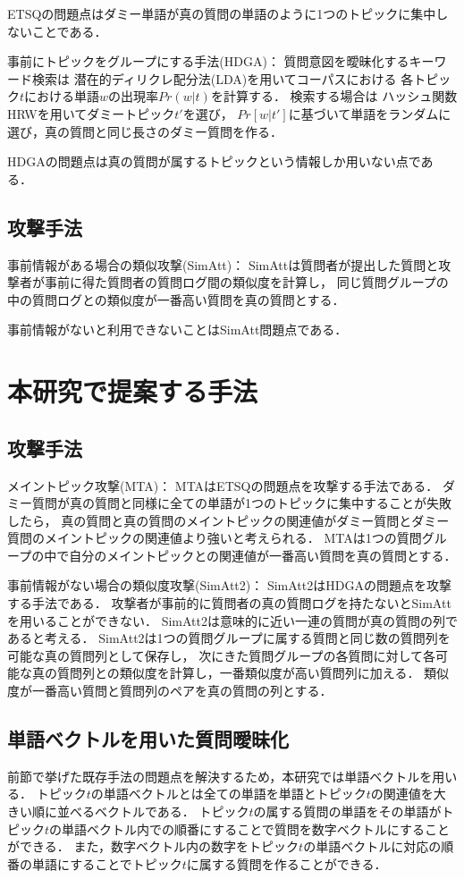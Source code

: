 \documentclass[papersize]{suribtabst}
\begin{document}
ETSQの問題点はダミー単語が真の質問の単語のように1つのトピックに集中しないことである．

事前にトピックをグループにする手法(HDGA)\cite{masking2014}：
質問意図を曖昧化するキーワード検索は
潜在的ディリクレ配分法(LDA)\cite{lda2003}を用いてコーパスにおける
各トピック$t$における単語$w$の出現率$Pr(w|t)$を計算する．
検索する場合は
ハッシュ関数HRW\cite{hrw1998}を用いてダミートピック$t'$を選び，
$Pr[w|t']$に基づいて単語をランダムに選び，真の質問と同じ長さのダミー質問を作る．

HDGAの問題点は真の質問が属するトピックという情報しか用いない点である．

\subsection{攻撃手法}
事前情報がある場合の類似攻撃(SimAtt)\cite{simattack2016}：
SimAttは質問者が提出した質問と攻撃者が事前に得た質問者の質問ログ間の類似度を計算し，
同じ質問グループの中の質問ログとの類似度が一番高い質問を真の質問とする．

事前情報がないと利用できないことはSimAtt問題点である．

\section{本研究で提案する手法}
\subsection{攻撃手法}
メイントピック攻撃(MTA)：
MTAはETSQの問題点を攻撃する手法である．
ダミー質問が真の質問と同様に全ての単語が1つのトピックに集中することが失敗したら，
真の質問と真の質問のメイントピックの関連値がダミー質問とダミー質問のメイントピックの関連値より強いと考えられる．
MTAは1つの質問グループの中で自分のメイントピックとの関連値が一番高い質問を真の質問とする．

事前情報がない場合の類似度攻撃(SimAtt2)：
SimAtt2はHDGAの問題点を攻撃する手法である．
攻撃者が事前的に質問者の真の質問ログを持たないとSimAttを用いることができない．
SimAtt2は意味的に近い一連の質問が真の質問の列であると考える．
SimAtt2は1つの質問グループに属する質問と同じ数の質問列を可能な真の質問列として保存し，
次にきた質問グループの各質問に対して各可能な真の質問列との類似度を計算し，一番類似度が高い質問列に加える．
類似度が一番高い質問と質問列のペアを真の質問の列とする．

\subsection{単語ベクトルを用いた質問曖昧化}
前節で挙げた既存手法の問題点を解決するため，本研究では単語ベクトルを用いる．
トピック$t$の単語ベクトルとは全ての単語を単語とトピック$t$の関連値を大きい順に並べるベクトルである．
トピック$t$の属する質問の単語をその単語がトピック$t$の単語ベクトル内での順番にすることで質問を数字ベクトルにすることができる．
また，数字ベクトル内の数字をトピック$t$の単語ベクトルに対応の順番の単語にすることでトピック$t$に属する質問を作ることができる．
\end{document}
